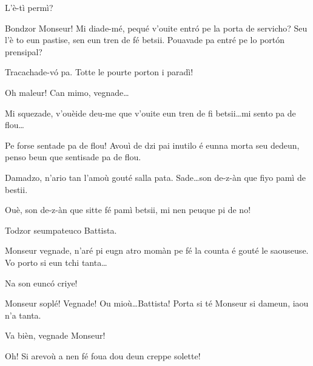 \begin{drama}


\Preyespeaks L’è-tì permì? 

\Cesarspeaks  Bondzor Monseur! Mi diade-mé, pequé v'ouite entr\'o pe la porta de servicho? Seu l'è to eun pastise, sen eun tren de fé betsii. Pouavade pa entré pe lo port\'on prensipal?

\Preyespeaks Tracachade-v\'o pa. Totte le pourte porton i paradì!

\Cesarspeaks{} Oh maleur! Can mimo, vegnade\ldots

\Preyespeaks{} Mi squezade, v'ouèide deu-me que v'ouite eun tren de fi betsii\ldots mi sento pa de flou\ldots

\Hermannspeaks{} Pe forse sentade pa de flou! Avouì de dzi pai inutilo é eunna morta seu dedeun, penso beun que sentisade pa de flou.

\Preyespeaks Damadzo, n’ario tan l'amoù gouté salla pata. Sade\ldots son de-z-àn que fiyo pamì de bestii.

\Battistaspeaks  Ouè, son de-z-àn que sitte fé pamì betsii, mi nen peuque pi de no! 


\Preyespeaks{} Todzor seumpateuco Battista.

\Cesarspeaks  Monseur vegnade, n’aré pi eugn atro momàn pe fé la counta é gouté le saouseuse. Vo porto si eun tchi tanta\ldots


\Preyespeaks Na son eunc\'o criye!

\Cesarspeaks Monseur soplé! Vegnade! Ou mioù\ldots Battista! Porta si té Monseur si dameun, iaou n'a tanta.

\Battistaspeaks Va bièn, vegnade Monseur!

\Cesarspeaks Oh! Si arevoù a nen fé foua dou deun creppe solette!


\ridocliou

\scene[-- La mii? ]



\end{drama}

